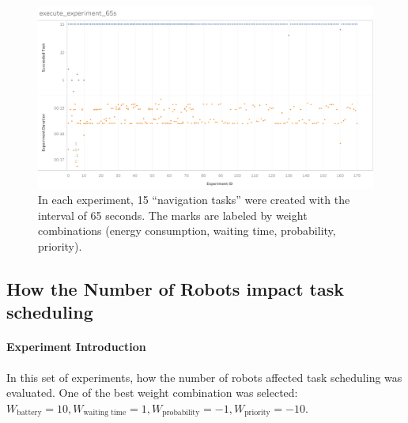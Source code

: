 \begin{figure}[htbp]
 \centering
 \includegraphics[width = 1.0\textwidth]{content/images/ch5/execute_experiment_65s.png}
 \caption{In each experiment, 15 ``navigation tasks'' were created with the interval of 65 seconds. The marks are labeled by weight combinations (energy consumption, waiting time, probability, priority).}
 \label{fig:experiment_task_65s}
\end{figure}

\subsection{How the Number of Robots impact task scheduling}

\paragraph{Experiment Introduction} 
In this set of experiments, how the number of robots affected task scheduling was evaluated. One of the best weight combination was selected: $ W_{\mbox{battery}} = 10,W_{\mbox{waiting time}} = 1, W_{\mbox{probability}} = -1, W_{\mbox{priority}} = -10 $. 
 


